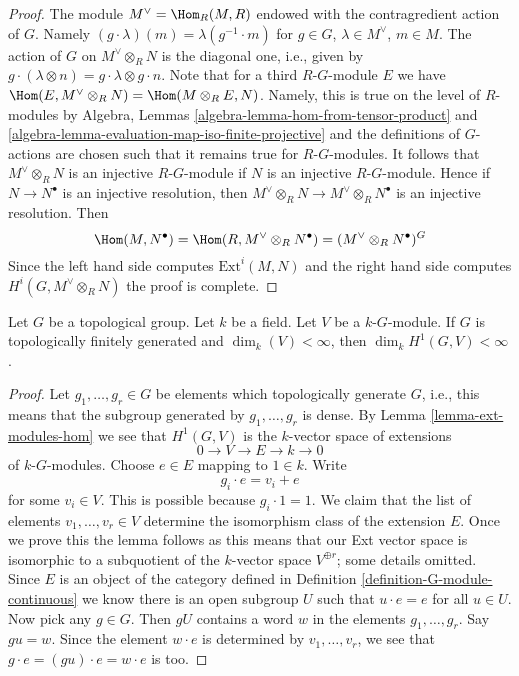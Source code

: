 \begin{proof}
The module $M^\vee = \Hom_R(M, R)$ endowed with the contragredient
action of $G$. Namely $(g \cdot \lambda)(m) = \lambda(g^{-1} \cdot m)$
for $g \in G$, $\lambda \in M^\vee$, $m \in M$. The action of $G$ on
$M^\vee \otimes_R N$ is the diagonal one, i.e., given by
$g \cdot (\lambda \otimes n) = g \cdot \lambda \otimes g \cdot n$.
Note that for a third $R\text{-}G$-module $E$ we have
$\Hom(E, M^\vee \otimes_R N) = \Hom(M \otimes_R E, N)$.
Namely, this is true on the level of $R$-modules by
Algebra, Lemmas \ref{algebra-lemma-hom-from-tensor-product} and
\ref{algebra-lemma-evaluation-map-iso-finite-projective}
and the definitions of $G$-actions are chosen such that it
remains true for $R\text{-}G$-modules. It follows that
$M^\vee \otimes_R N$ is an injective $R\text{-}G$-module
if $N$ is an injective $R\text{-}G$-module. Hence if
$N \to N^\bullet$ is an injective resolution, then
$M^\vee \otimes_R N \to M^\vee \otimes_R N^\bullet$
is an injective resolution. Then
$$
\Hom(M, N^\bullet) = \Hom(R, M^\vee \otimes_R N^\bullet) =
(M^\vee \otimes_R N^\bullet)^G
$$
Since the left hand side computes $\text{Ext}^i(M, N)$ and the right
hand side computes $H^i(G, M^\vee \otimes_R N)$ the proof is complete.
\end{proof}

\begin{lemma}
\label{lemma-finite-dim-group-cohomology}
Let $G$ be a topological group. Let $k$ be a field.
Let $V$ be a $k\text{-}G$-module.
If $G$ is topologically finitely generated and
$\dim_k(V) < \infty$, then $\dim_k H^1(G, V) < \infty$.
\end{lemma}

\begin{proof}
Let $g_1, \ldots, g_r \in G$ be elements which topologically generate $G$,
i.e., this means that the subgroup generated by $g_1, \ldots, g_r$ is dense.
By Lemma \ref{lemma-ext-modules-hom}
we see that $H^1(G, V)$ is the $k$-vector space of extensions
$$
0 \to V \to E \to k \to 0
$$
of $k\text{-}G$-modules. Choose $e \in E$ mapping to $1 \in k$.
Write
$$
g_i \cdot e = v_i + e
$$
for some $v_i \in V$. This is possible because $g_i \cdot 1 = 1$.
We claim that the list of elements $v_1, \ldots, v_r \in V$
determine the isomorphism class of the extension $E$.
Once we prove this the lemma follows as this means that our
Ext vector space is isomorphic to a subquotient of the $k$-vector
space $V^{\oplus r}$; some details omitted.
Since $E$ is an object of the category defined in
Definition \ref{definition-G-module-continuous}
we know there is an open subgroup $U$ such that
$u \cdot e = e$ for all $u \in U$.
Now pick any $g \in G$. Then $gU$ contains a word $w$ in
the elements $g_1, \ldots, g_r$.
Say $gu = w$. Since the element $w \cdot e$ is determined by
$v_1, \ldots, v_r$, we see that $g \cdot e = (gu) \cdot e = w \cdot e$
is too.
\end{proof}

